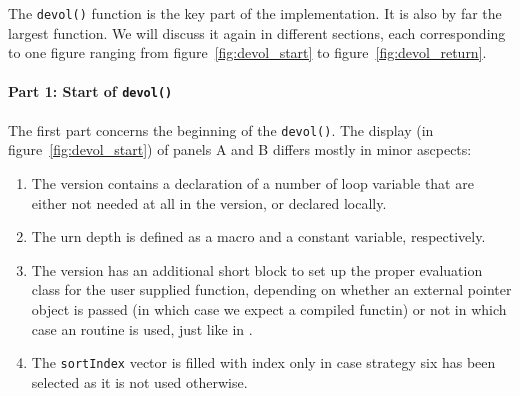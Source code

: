 \documentclass[nojss,shortnames,article]{jss}
\begin{document}
The \verb|devol()| function is the key part of the 
implementation. It is also by far the largest function.  We will discuss it
again in different sections, each corresponding to one figure ranging from
figure~\ref{fig:devol_start} to figure~\ref{fig:devol_return}.

\paragraph{Part 1: Start of \texttt{devol()}} The first part concerns the
beginning of the \verb|devol()|. The display (in
figure~\ref{fig:devol_start}) of panels A and B differs mostly in minor
ascpects:
\begin{enumerate}
\item The  version contains a declaration of a number of loop
  variable that are either not needed at all in the  version,
  or declared locally.
\item The urn depth is defined as a  macro and a constant
  variable, respectively.
\item The  version has an additional short block to set up the
  proper evaluation class for the user supplied function, depending on
  whether an external pointer object is passed (in which case we expect a
  compiled functin) or not in which case an  routine is used,
  just like in .
\item The \texttt{sortIndex} vector is filled with index only in case
  strategy six has been selected as it is not used otherwise.
\end{enumerate}
\end{document}

